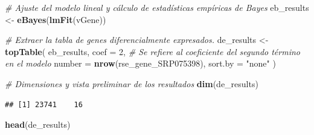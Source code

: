 \documentclass[
]{article}
\newenvironment{Shaded}{\begin{snugshade}}{\end{snugshade}}
\newcommand{\AttributeTok}[1]{\textcolor[rgb]{0.13,0.29,0.53}{#1}}
\newcommand{\CommentTok}[1]{\textcolor[rgb]{0.56,0.35,0.01}{\textit{#1}}}
\newcommand{\DecValTok}[1]{\textcolor[rgb]{0.00,0.00,0.81}{#1}}
\newcommand{\FunctionTok}[1]{\textcolor[rgb]{0.13,0.29,0.53}{\textbf{#1}}}
\newcommand{\NormalTok}[1]{#1}
\newcommand{\OtherTok}[1]{\textcolor[rgb]{0.56,0.35,0.01}{#1}}
\newcommand{\StringTok}[1]{\textcolor[rgb]{0.31,0.60,0.02}{#1}}
\begin{document}
\begin{Shaded}
\begin{Highlighting}[]
\CommentTok{\# Ajuste del modelo lineal y cálculo de estadísticas empíricas de Bayes}
\NormalTok{eb\_results }\OtherTok{\textless{}{-}} \FunctionTok{eBayes}\NormalTok{(}\FunctionTok{lmFit}\NormalTok{(vGene))}


\CommentTok{\# Extraer la tabla de genes diferencialmente expresados.}
\NormalTok{de\_results }\OtherTok{\textless{}{-}} \FunctionTok{topTable}\NormalTok{(}
\NormalTok{    eb\_results,}
    \AttributeTok{coef =} \DecValTok{2}\NormalTok{, }\CommentTok{\# Se refiere al coeficiente del segundo término en el modelo}
    \AttributeTok{number =} \FunctionTok{nrow}\NormalTok{(rse\_gene\_SRP075398),}
    \AttributeTok{sort.by =} \StringTok{"none"}
\NormalTok{)}

\CommentTok{\# Dimensiones y vista preliminar de los resultados}
\FunctionTok{dim}\NormalTok{(de\_results)}
\end{Highlighting}
\end{Shaded}

\begin{verbatim}
## [1] 23741    16
\end{verbatim}

\begin{Shaded}
\begin{Highlighting}[]
\FunctionTok{head}\NormalTok{(de\_results)}
\end{Highlighting}
\end{Shaded}
\end{document}
